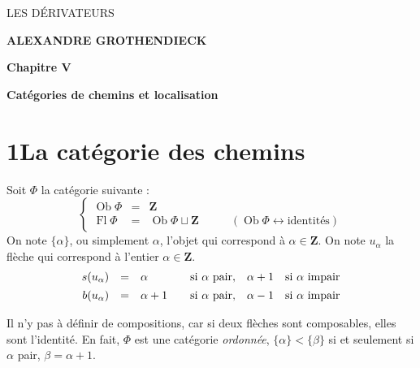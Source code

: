 \documentclass[11pt]{article}
\newcommand{\printedpage}[1]{\marginpar{\footnotesize p.~#1}}
\newcommand{\msp}[1]{\marginpar{\footnotesize [#1]}}
\newcommand{\Ob}{\operatorname{Ob}}
\newcommand{\Fl}{\operatorname{Fl}}
\begin{document}
\printedpage{}

\begin{center}
\vspace*{6cm}

{\LARGE\textsf{LES DÉRIVATEURS}}

\vspace{1.5cm}

{\large\textbf{ALEXANDRE GROTHENDIECK}}

\vspace{2.5cm}

{\large\textbf{Chapitre V}}

\vspace{0.4cm}

{\large\textbf{Catégories de chemins et localisation}}
\end{center}

\clearpage


\printedpage{1}

\msp{page 1}

\section*{1\quad La catégorie des chemins}

Soit $\Phi$ la catégorie suivante :
\[
\left\{
\begin{array}{rcll}
\Ob\Phi & = & \mathbf{Z} & \\
\Fl\Phi & = & \Ob\Phi\sqcup\mathbf{Z} & \qquad (\Ob\Phi\leftrightarrow\text{identités})
\end{array}
\right.
\]
On note $\{\alpha\}$, ou simplement $\alpha$, l'objet qui correspond à $\alpha\in\mathbf{Z}$. On note $u_\alpha$ la flèche qui correspond à l'entier $\alpha\in\mathbf{Z}$.
\[
\begin{array}{rcl@{\qquad}l@{\quad}l@{\quad}l}
s(u_\alpha) & = & \alpha & \text{si } \alpha \text{ pair}, & \alpha+1 & \text{si } \alpha \text{ impair}\\[1ex]
b(u_\alpha) & = & \alpha+1 & \text{si } \alpha \text{ pair}, & \alpha-1 & \text{si } \alpha \text{ impair}
\end{array}
\]

Il n'y pas à définir de compositions, car si deux flèches sont composables, elles sont l'identité. En fait, $\Phi$ est une catégorie \textit{ordonnée}, $\{\alpha\}<\{\beta\}$ si et seulement si $\alpha$ pair, $\beta=\alpha+1$. %
\end{document}
